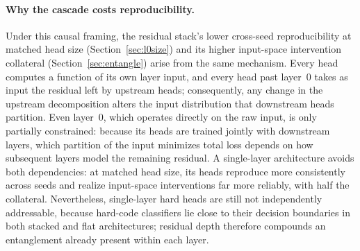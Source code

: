 \paragraph{Why the cascade costs reproducibility.}
Under this causal framing, the residual stack's lower cross-seed
reproducibility at matched head size (Section~\ref{sec:l0size}) and its
higher input-space intervention collateral (Section~\ref{sec:entangle})
arise from the same mechanism. Every head computes a function of its own
layer input, and every head past layer~0 takes as input the residual left
by upstream heads; consequently, any change in the upstream decomposition
alters the input distribution that downstream heads partition. Even
layer~0, which operates directly on the raw input, is only partially
constrained: because its heads are trained jointly with downstream
layers, which partition of the input minimizes total loss depends on how
subsequent layers model the remaining residual. A single-layer
architecture avoids both dependencies: at matched head size, its heads
reproduce more consistently across seeds and realize input-space
interventions far more reliably, with half the collateral. Nevertheless,
single-layer hard heads are still not independently addressable, because
hard-code classifiers lie close to their decision boundaries in both
stacked and flat architectures; residual depth therefore compounds an
entanglement already present within each layer.

